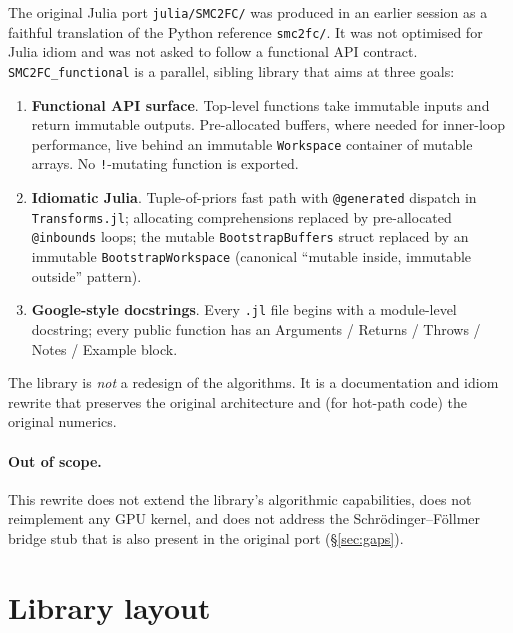\documentclass[11pt,a4paper]{article}
\begin{document}
The original Julia port \texttt{julia/SMC2FC/} was produced in an earlier
session as a faithful translation of the Python reference
\texttt{smc2fc/}. It was not optimised for Julia idiom and was not asked
to follow a functional API contract. \texttt{SMC2FC\_functional} is a
parallel, sibling library that aims at three goals:

\begin{enumerate}[leftmargin=*]
\item \textbf{Functional API surface}. Top-level functions take immutable
inputs and return immutable outputs. Pre-allocated buffers, where needed
for inner-loop performance, live behind an immutable \texttt{Workspace}
container of mutable arrays. No \texttt{!}-mutating function is exported.
\item \textbf{Idiomatic Julia}. Tuple-of-priors fast path with
\texttt{@generated} dispatch in \texttt{Transforms.jl}; allocating
comprehensions replaced by pre-allocated \texttt{@inbounds} loops; the
mutable \texttt{BootstrapBuffers} struct replaced by an immutable
\texttt{BootstrapWorkspace} (canonical ``mutable inside, immutable
outside'' pattern).
\item \textbf{Google-style docstrings}. Every \texttt{.jl} file begins with
a module-level docstring; every public function has an Arguments / Returns
/ Throws / Notes / Example block.
\end{enumerate}

The library is \emph{not} a redesign of the algorithms. It is a
documentation and idiom rewrite that preserves the original architecture
and (for hot-path code) the original numerics.

\paragraph{Out of scope.}
This rewrite does not extend the library's algorithmic capabilities, does
not reimplement any GPU kernel, and does not address the
Schrödinger--Föllmer bridge stub that is also present in the original port
(\S\ref{sec:gaps}).

\section{Library layout}
\end{document}

